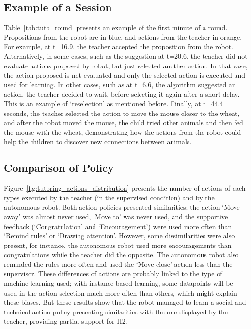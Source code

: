 \subsection{Example of a Session}

Table~\ref{tab:tuto_round} presents an example of the first minute of a round. Propositions from the robot are in blue, and actions from the teacher in orange. For example, at t=16.9, the teacher accepted the proposition from the robot. Alternatively, in some cases, such as the suggestion at t=20.6, the teacher did not evaluate actions proposed by robot, but just selected another action. In that case, the action proposed is not evaluated and only the selected action is executed and used for learning. In other cases, such as at t=6.6, the algorithm suggested an action, the teacher decided to wait, before selecting it again after a short delay. This is an example of `reselection' as mentioned before. Finally, at t=44.4 seconds, the teacher selected the action to move the mouse closer to the wheat, and after the robot moved the mouse, the child tried other animals and then fed the mouse with the wheat, demonstrating how the actions from the robot could help the children to discover new connections between animals.


\subsection{Comparison of Policy}

Figure~\ref{fig:tutoring_actions_distribution} presents the number of actions of each types executed by the teacher (in the supervised condition) and by the autonomous robot. Both action policies presented similarities: the action `Move away' was almost never used, `Move to' was never used, and the supportive feedback (`Congratulation' and `Encouragement') were used more often than `Remind rules' or `Drawing attention'. However, some dissimilarities were also present, for instance, the autonomous robot used more encouragements than congratulations while the teacher did the opposite. The autonomous robot also reminded the rules more often and used the `Move close' action less than the supervisor. These differences of actions are probably linked to the type of machine learning used; with instance based learning, some datapoints will be used in the action selection much more often than others, which might explain these biases. But these results show that the robot managed to learn a social and technical action policy presenting similarities with the one displayed by the teacher, providing partial support for H2.

